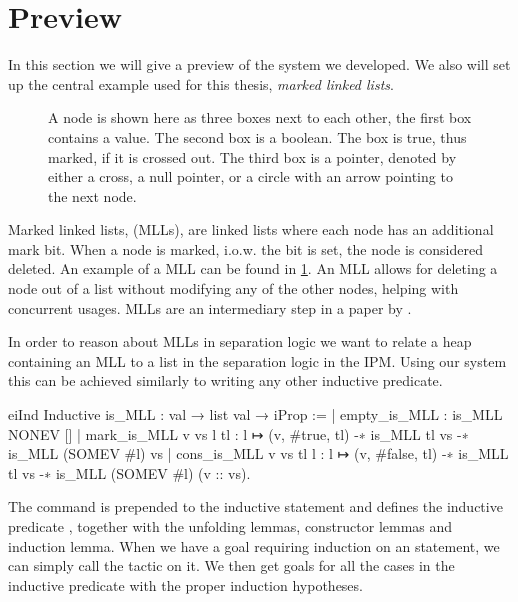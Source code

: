 \documentclass[thesis.tex]{subfiles}
\begin{document}
\section{Preview}
In this section we will give a preview of the system we developed. We also will set up the central example used for this thesis, \emph{marked linked lists}.
\begin{figure}[ht]
  \centering
  \caption{A node is shown here as three boxes next to each other, the first box contains a value. The second box is a boolean. The box is true, thus marked, if it is crossed out. The third box is a pointer, denoted by either a cross, a null pointer, or a circle with an arrow pointing to the next node.}
  \label{fig:MLLdiag}
\end{figure}

Marked linked lists, (MLLs), are linked lists where each node has an additional mark bit. When a node is marked, i.o.w. the bit is set, the node is considered deleted. An example of a MLL can be found in \cref{fig:MLLdiag}. An MLL allows for deleting a node out of a list without modifying any of the other nodes, helping with concurrent usages. MLLs are an intermediary step in a paper by  \cite{fomitchevLockfreeLinkedLists2004a}.

In order to reason about MLLs in separation logic we want to relate a heap containing an MLL to a list in the separation logic in the IPM. Using our system this can be achieved similarly to writing any other inductive predicate.
\begin{coqcode}
  eiInd
  Inductive is_MLL : val → list val → iProp :=
      | empty_is_MLL : is_MLL NONEV []
      | mark_is_MLL v vs l tl : 
        l ↦ (v, #true, tl) -∗ is_MLL tl vs -∗ 
        is_MLL (SOMEV #l) vs
      | cons_is_MLL v vs tl l : 
        l ↦ (v, #false, tl) -∗ is_MLL tl vs -∗ 
        is_MLL (SOMEV #l) (v :: vs).
\end{coqcode}
The command  is prepended to the inductive statement and defines the inductive predicate , together with the unfolding lemmas, constructor lemmas and induction lemma. When we have a goal requiring induction on an  statement, we can simply call the  tactic on it. We then get goals for all the cases in the inductive predicate with the proper induction hypotheses.
\end{document}

